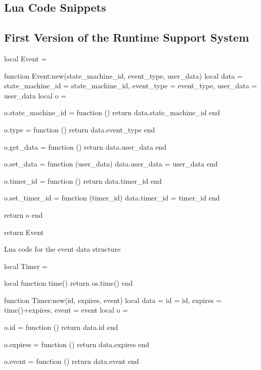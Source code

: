 \begin{appendices}

\chapter{Lua Code Snippets}
\label{app:code}

\section{First Version of the Runtime Support System}
\label{code:rts}

\begin{listing}[htp]
\begin{luacode}
local Event = {}

function Event:new(state_machine_id, event_type, user_data)
	local data = {state_machine_id = state_machine_id, event_type = event_type,
	              user_data = user_data}
	local o = {}

	o.state_machine_id = function ()
		return data.state_machine_id
	end

	o.type = function ()
		return data.event_type
	end

	o.get_data = function ()
		return data.user_data
	end

	o.set_data = function (user_data)
		data.user_data = user_data
	end

	o.timer_id = function ()
		return data.timer_id
	end

	o.set_timer_id = function (timer_id)
		data.timer_id = timer_id
	end

	return o
end

return Event
\end{luacode}
	\caption{Lua code for the event data structure }
	\label{code:event}
\end{listing}

\begin{listing}[htp]
\begin{luacode}
local Timer = {}

local function time()
	return os.time()
end

function Timer:new(id, expires, event)
	local data = {id = id, expires = time()+expires, event = event}
	local o = {}

	o.id = function ()
		return data.id
	end

	o.expires = function ()
		return data.expires
	end

	o.event = function ()
		return data.event
	end


\end{luacode}
\end{listing}
\end{appendices}
